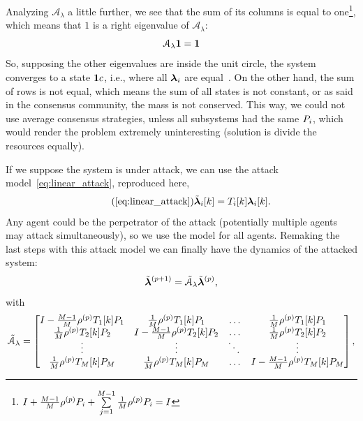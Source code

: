 \documentclass[../main.tex]{subfiles}
\begin{document}
Analyzing $\mathcal{A}_{\lambda}$ a little further, we see that the sum of its columns is equal to one\footnote{$I+\frac{M-1}{M}\rho^{(p)} {P}_{i}+\sum\limits_{j=1}^{M-1}\frac{1}{M}\rho^{(p)} {P}_{i}=I$},
which means that $1$ is a right eigenvalue of $\mathcal{A}_{\lambda}$:
\begin{equation*}
  \mathcal{A}_{\lambda}\mathbf{1}=\mathbf{1}
\end{equation*}
So, supposing the other eigenvalues are inside the unit circle, the system converges to a state $\mathbf{1}c$, i.e., where all $\boldsymbol{\lambda}_{i}$ are equal~\cite{GarinSchenato2010,XiaoEtAl2007}.
On the other hand, the sum of rows is not equal, which means the sum of all states is not constant, or as said in the consensus community, the mass is not conserved.
This way, we could not use average consensus strategies, unless all subsystems had the same ${P}_{i}$, which would render the problem extremely uninteresting (solution is divide the resources equally).

If we suppose the system is under attack, we can use the attack model~\eqref{eq:linear_attack}, reproduced here,
\begin{equation}
  \label{eq:linear_attack_reprise}
  \tag{\ref*{eq:linear_attack}}
  \lambdaicheat[k]=\Tik\lambdaik.
\end{equation}
Any agent could be the perpetrator of the attack (potentially multiple agents may attack simultaneously), so we use the model for all agents.
Remaking the last steps with this attack model we can finally have the dynamics of the attacked system:
\begin{equation}
  \label{eq:negotiation_equation_substituting_organizing_under_attack}
  \tilde{\boldsymbol{\lambda}}^{(p+1)}=\tilde{\mathcal{A}}_{\lambda}\tilde{\boldsymbol{\lambda}}^{(p)},
\end{equation}
with
\begin{equation}
\tilde{\mathcal{A}}_{\lambda}=\left[
\begin{matrix}
I-\frac{M-1}{M}\rho\p \Tik[1]\Plin[1] & \frac{1}{M}\rho\p \Tik[1]\Plin[1]&\dots&\frac{1}{M}\rho\p \Tik[1]\Plin[1]\\
\frac{1}{M}\rho\p \Tik[2]\Plin[2]&I-\frac{M-1}{M}\rho\p \Tik[2]\Plin[2]&\dots&\frac{1}{M}\rho\p \Tik[2]\Plin[2]\\
\vdots&\vdots&\ddots&\vdots\\
\frac{1}{M}\rho\p \Tik[M]\Plin[M]&\frac{1}{M}\rho\p \Tik[M]\Plin[M]&\dots&I-\frac{M-1}{M}\rho\p \Tik[M]\Plin[M]\\
\end{matrix}
\right],
\end{equation}
\end{document}
